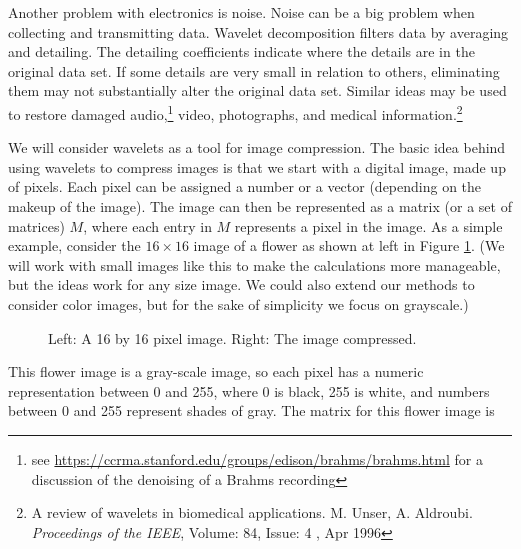  Another problem with electronics is noise. Noise can be a big problem when collecting and transmitting data. Wavelet decomposition filters data by averaging and detailing. The detailing coefficients indicate where the details are in the original data set. If some details are very small in relation to others, eliminating them may not substantially alter the original data set. Similar ideas may be used to restore damaged audio,\footnote{see \url{https://ccrma.stanford.edu/groups/edison/brahms/brahms.html} for a discussion of the denoising of a Brahms recording} video, photographs, and medical information.\footnote{A review of wavelets in biomedical applications.  M. Unser, A. Aldroubi. \emph{Proceedings of the IEEE}, Volume: 84, Issue: 4 , Apr 1996}

We will consider wavelets as a tool for image compression. The basic idea behind using wavelets to compress images is that we start with a digital image, made up of pixels. Each pixel can be assigned a number or a vector (depending on the makeup of the image). The image can then be represented as a matrix (or a set of matrices) $M$, where each entry in $M$ represents a pixel in the image. As a simple example, consider the $16 \times 16$ image of a flower as shown at left in Figure \ref{F:Flower_1}. (We will work with small images like this to make the calculations more manageable, but the ideas work for any size image. We could also extend our methods to consider color images, but for the sake of simplicity we focus on grayscale.) 
\begin{figure}[h]
\begin{center}
 \hspace{0.1in} 
\end{center}
\caption{Left: A 16 by 16 pixel image. Right: The image compressed.}
\label{F:Flower_1}
\end{figure}
This flower image is a gray-scale image, so each pixel has a numeric representation between 0 and 255, where 0 is black,  255 is white, and numbers between 0 and 255 represent shades of gray. The matrix for this flower image is 
